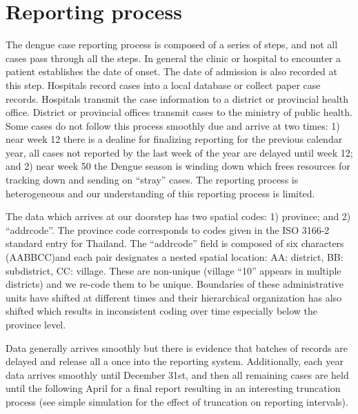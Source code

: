 \section{Reporting process}

The dengue case reporting process is composed of a series of steps, and not all cases pass through all the steps.  In general the clinic or hospital to encounter a patient establishes the date of onset.  The date of admission is also recorded at this step.  Hospitals record cases into a local database or collect paper case records.  Hospitals transmit the case information to a district or provincial health office.  District or provincial offices transmit cases to the ministry of public health.  Some cases do not follow this process smoothly due and arrive at two times: 1) near week 12 there is a dealine for finalizing reporting for the previous calendar year, all cases not reported by the last week of the year are delayed until week 12; and 2) near week 50 the Dengue season is winding down which frees resources for tracking down and sending on ``stray'' cases.  The reporting process is heterogeneous and our understanding of this reporting process is limited. 

The data which arrives at our doorstep has two spatial codes: 1) province; and 2) ``addrcode''.  The province code corresponds to codes given in the ISO 3166-2 standard entry for Thailand.  The ``addrcode'' field is composed of six characters (AABBCC)and each pair designates a nested spatial location: AA: district, BB: subdistrict, CC: village.  These are non-unique (village ``10'' appears in multiple districts) and we re-code them to be unique.  Boundaries of these administrative units have shifted at different times and their hierarchical organization has also shifted which results in inconsistent coding over time especially below the province level.

Data generally arrives smoothly but there is evidence that batches of records are delayed and release all a once into the reporting system.  Additionally, each year data arrives smoothly until December 31st, and then all remaining cases are held until the following April for a final report resulting in an interesting truncation process (see simple simulation for the effect of truncation on reporting intervals).
